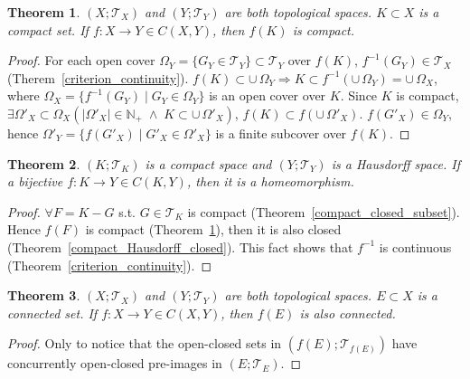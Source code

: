 \documentclass[openany]{book}
\theoremstyle{plain}
\newtheorem{theorem}{Theorem}[section] %
\theoremstyle{definition}
\begin{document}
\begin{theorem}\label{compact_continuous}
$(X;\mathscr{T}_X)$ and $(Y;\mathscr{T}_Y)$ are both topological spaces. $K\subset X$ is a compact set. If $f: X\to Y \in C( X, Y)$, then $f( K)$ is compact.
\end{theorem}
\begin{proof}
For each open cover $\Omega_Y = \{ G_Y \in \mathscr{T}_Y\} \subset \mathscr{T}_Y$ over $f( K)$, $f ^{-1} ( G_Y) \in \mathscr{T}_X$ (Therem~\ref{criterion_continuity}). $f( K) \subset \cup\,\Omega_Y \Rightarrow K \subset f ^{-1} \left(  \cup\,\Omega_Y \right) = \cup\,\Omega_X $, where $\Omega_X = \{ f ^{-1} ( G_Y) \mid G_Y \in \Omega_Y\} $ is an open cover over $K$. Since $K$ is compact,
$\exists \Omega'_X \subset \Omega_X\left( 
\lvert \Omega'_X \rvert \in \mathbb{N}_+ 
\;\wedge\;K\subset \cup\,\Omega'_X
\right)$, $f( K) \subset f ( \cup\,\Omega'_X) $. $f ( G'_X) \in \Omega_Y$, hence $\Omega'_Y = \{ f ( G'_X) \mid G'_X \in \Omega'_X\}$ is a finite subcover over $f( K)$.
\end{proof}
\begin{theorem}\label{compact_Hausdorff_continuous_homeomorphism}
$(K;\mathscr{T}_K)$ is a compact space and $(Y;\mathscr{T}_Y)$ is a Hausdorff space. If a bijective $f: K\to Y \in C( K, Y)$, then it is a homeomorphism.
\end{theorem}
\begin{proof}
$\forall F = K - G$ s.t. $G \in \mathscr{T}_K$ is compact (Theorem~\ref{compact_closed_subset}). Hence $f ( F) $ is compact (Theorem~\ref{compact_continuous}), then it is also closed
(Theorem~\ref{compact_Hausdorff_closed}). This fact shows that $f ^{-1}$ is continuous (Theorem~\ref{criterion_continuity}).
\end{proof}
\begin{theorem}\label{connected_continuous}
$(X;\mathscr{T}_X)$ and $(Y;\mathscr{T}_Y)$ are both topological spaces. $E\subset X$ is a connected set. If $f: X\to Y \in C( X, Y)$, then $f( E)$ is also connected.
\end{theorem}
\begin{proof}
Only to notice that the open-closed sets in $( f( E) ; \mathscr{T}_{ f( E)})$ have concurrently open-closed pre-images in $( E; \mathscr{T}_E)$.
\end{proof}
\end{document}
